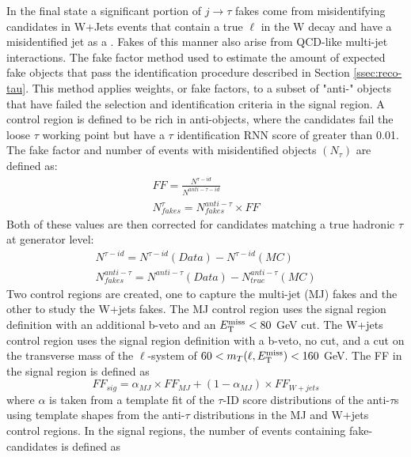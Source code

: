 		In the \taulep final state a significant portion of $j \rightarrow \tau$ fakes come from misidentifying \tauhad candidates in W+Jets events that contain a true $\ell$ in the W decay and have a misidentified jet as a \tauhad. Fakes of this manner also arise from QCD-like multi-jet interactions. The fake factor method used to estimate the amount of expected fake \tauhad objects that pass the \tauhad identification procedure described in Section \ref{ssec:reco-tau}. This method applies weights, or fake factors, to a subset of "anti-\tauhad" objects that have failed the selection and identification criteria in the signal region. A control region is defined to be rich in anti-\tauhad objects, where the \tauhad candidates fail the loose $\tau$ working point but have a $\tau$ identification RNN score of greater than 0.01. The fake factor and number of events with misidentified \tauhad objects $(N_{\tau})$ are defined as:
		\begin{equation}\label{eqn:ff}\begin{split}
		FF = \frac{ N^{\tau-id} }{N^{anti-\tau-id}} \\
		N_{fakes}^{\tau} = N^{anti-\tau}_{fakes} \times FF
		\end{split}\end{equation}
		Both of these values are then corrected for \tauhad candidates matching a true hadronic $\tau$ at generator level:
		\begin{equation}\label{eqn:ff-corrected}\begin{split}
		N^{\tau-id} = N^{\tau-id}(Data) - N^{\tau-id}(MC) \\
		N^{anti-\tau}_{fakes} = N^{anti-\tau}(Data) - N^{anti-\tau}_{true} (MC)
		\end{split}\end{equation}
		Two control regions are created, one to capture the multi-jet (MJ) fakes and the other to study the W+jets fakes. The MJ control region uses the \taujets signal region definition with an additional b-veto and an $E_\text{T}^\text{miss} < 80$ GeV cut. The W+jets control region uses the \taulep signal region definition with a b-veto, no \Etm cut, and a cut on the transverse mass of the $\ell$-\Etm system of $60 < m_{T}(\ell, E_\text{T}^\text{miss})<160$ GeV.
		The FF in the signal region is defined as 
		\begin{equation}\label{eqn:ff-sig}
		FF_{sig} = \alpha_{MJ} \times FF_{MJ} + (1 - \alpha_{MJ}) \times FF_{W+jets}
		\end{equation}
		where $\alpha$ is taken from a template fit of the $\tau$-ID score distributions of the anti-$\tau$s using template shapes from the anti-$\tau$ distributions in the MJ and W+jets control regions. In the signal regions, the number of events containing fake-\tauhad candidates is defined as
